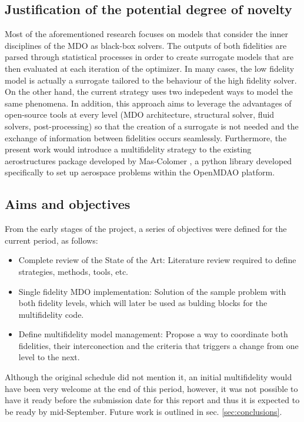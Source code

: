 \subsection{Justification of the potential degree of novelty}
Most of the aforementioned research focuses on models that consider the inner disciplines of the MDO as black-box solvers. The outputs of both fidelities are parsed through statistical processes in order to create surrogate models that are then evaluated at each iteration of the optimizer. In many cases, the low fidelity model is actually a surrogate tailored to the behaviour of the high fidelity solver. On the other hand, the current strategy uses two indepedent ways to model the same phenomena. In addition, this approach aims to leverage the advantages of open-source tools at every level (MDO architecture, structural solver, fluid solvers, post-processing) so that the creation of a surrogate is not needed and the exchange of information between fidelities occurs seamlessly. Furthermore, the present work would introduce a multifidelity strategy to the existing aerostructures package developed by Mas-Colomer \cite{mascolomer:tel-02023612}, a python library developed specifically to set up aerospace problems within the OpenMDAO platform.     
\subsection{Aims and objectives}
From the early stages of the project, a series of objectives were defined for the current period, as follows: 
\begin{itemize}
    \item Complete review of the State of the Art: Literature review required to define strategies, methods, tools, etc.
    \item Single fidelity MDO implementation: Solution of the sample problem with both fidelity levels, which will later be used as bulding blocks for the multifidelity code.
    \item Define multifidelity model management: Propose a way to coordinate both fidelities, their interconection and the criteria that triggers a change from one level to the next. 
\end{itemize}
Although the original schedule did not mention it, an initial multifidelity would have been very welcome at the end of this period, however, it was not possible to have it ready before the submission date for this report and thus it is expected to be ready by mid-September. Future work is outlined in sec. \ref{sec:conclusions}.

